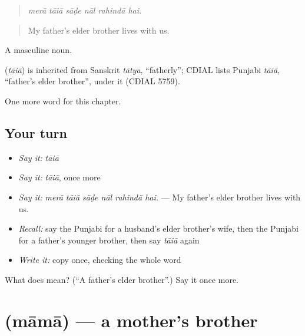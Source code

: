 \begin{quote}
     
\end{quote}

\begin{quote}
\emph{merā tāiā sāḍe nāl rahindā hai.}
\end{quote}

\begin{quote}
My father's elder brother lives with us.
\end{quote}

A masculine noun.

\begin{cousinweb}
\textbf{} (\emph{tāiā}) is inherited from Sanskrit \emph{tātya}, \textquotedblleft{}fatherly\textquotedblright{}; CDIAL lists Punjabi \emph{tāiā}, \textquotedblleft{}father's elder brother\textquotedblright{}, under it (CDIAL 5759).
\end{cousinweb}

\begin{grammarlens}[title={What you've built}]
One more word for this chapter.
\end{grammarlens}

\subsection*{Your turn}
\begin{itemize}
\raggedright
  \item \emph{Say it:} \emph{tāiā}
  \item \emph{Say it:} \emph{tāiā}, once more
  \item \emph{Say it:} \emph{merā tāiā sāḍe nāl rahindā hai.} — My father's elder brother lives with us.
  \item \emph{Recall:} say the Punjabi for a husband's elder brother's wife, then the Punjabi for a father's younger brother, then say \emph{tāiā} again
  \item \emph{Write it:} copy \textbf{} once, checking the whole word
\end{itemize}

\begin{tcolorbox}[breakable,colback=teal!4,colframe=teal!35!black,title={Before you move on}]
What does  mean? (\textquotedblleft{}A father's elder brother\textquotedblright{}.) Say it once more.
\end{tcolorbox}
\section[\texorpdfstring{\pa{ਮਾਮਾ} (māmā)}{ਮਾਮਾ (māmā)}]{ (māmā) — a mother's brother}

